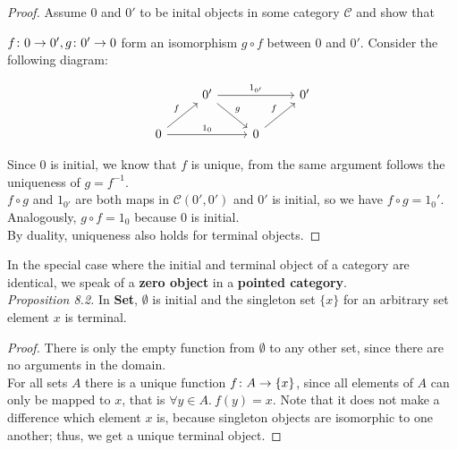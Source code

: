 \begin{proof}
Assume $0$ and $0'$ to be inital objects in some category $\mathscr{C}$ and show that

$f \from 0 \to 0', g \from 0' \to 0$ form an isomorphism
$g \circ f$ between $0$ and $0'$. Consider the following diagram:

\[
\begin{tikzcd}
  & 0' \arrow{dr}{g} \arrow{rr}{1_{0'}}    &&  0'\\
  0 \arrow{ur}{f} \arrow{rr}{1_0} && 0 \arrow{ur}{f}
\end{tikzcd}
\]


Since $0$ is initial, we know that $f$ is unique, from the same argument follows the uniqueness of $g = f^{-1}$. \\$f \circ g$ and $1_{0'}$ are both maps in $\mathscr{C}(0', 0')$ and $0'$ is initial, so we have $f \circ g = 1_0'$. Analogously, $g \circ f = 1_0$ because $0$ is initial. \\
By duality, uniqueness also holds for terminal objects. 
\end{proof}
In the special case where the initial and terminal object of a category are identical, we speak of a \textbf{zero object} in a \textbf{pointed category}.\\
\textit{Proposition 8.2.} In \textbf{Set}, $\emptyset$ is initial and the singleton set $\{x\}$ for an arbitrary set element $x$ is terminal.
\begin{proof}
There is only the empty function from $\emptyset$ to any other set, since there are no arguments in the domain.
\\For all sets $A$ there is a unique function $f \from A \to \{x\}$, since all elements of $A$ can only be mapped
  to $x$, that is $\forall y \in A.\ f(y) = x$. Note that it does not make a difference which element $x$ is, because singleton objects are isomorphic to one another; thus, we get a unique terminal object.
\end{proof}
